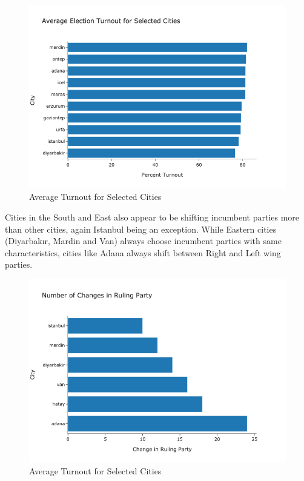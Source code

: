 \documentclass[12pt]{article}
\begin{document}
\begin{figure}[h]
 \centering
\includegraphics[width=15cm]{paper/turnout_selected.png}
 \caption{Average Turnout for Selected Cities}
\end{figure}
\newpage
Cities in the South and East also appear to be shifting incumbent parties more than other cities, again Istanbul being an exception. While Eastern cities (Diyarbakır, Mardin and Van) always choose incumbent parties with same characteristics, cities like Adana always shift between Right and Left wing parties.

\begin{figure}[h]
 \centering
\includegraphics[width=15cm]{paper/change_party.png}
 \caption{Average Turnout for Selected Cities}
\end{figure}
\end{document}
